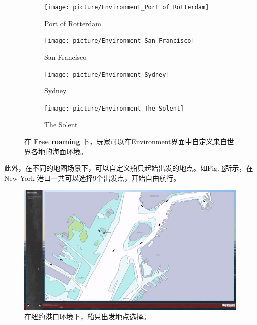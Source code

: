 \documentclass[letterpaper,10pt]{article}
\begin{document}
\begin{figure}[htbp]
					\begin{subfigure}{0.24\textwidth}
						\texttt{[image: picture/Environment\_Port of Rotterdam]}
						\captionsetup{font=scriptsize}
						\caption{Port of Rotterdam}
						\label{fig: Environment_Port of Rotterdam}
					\end{subfigure}
					\begin{subfigure}{0.24\textwidth}
						\texttt{[image: picture/Environment\_San Francisco]}
						\captionsetup{font=scriptsize}
						\caption{San Francisco}
						\label{fig: Environment_San Francisco}
					\end{subfigure}
					\begin{subfigure}{0.24\textwidth}
						\texttt{[image: picture/Environment\_Sydney]}
						\captionsetup{font=scriptsize}
						\caption{Sydney}
						\label{fig: Environment_Sydney}	
					\end{subfigure}
					\begin{subfigure}{0.24\textwidth}
						\texttt{[image: picture/Environment\_The Solent]}
						\captionsetup{font=scriptsize}
						\caption{The Solent}
						\label{fig: Environment_The Solent}	
					\end{subfigure}
					
					\captionsetup{font=scriptsize}
					\caption{
						\label{fig: Environment selection}
						在 \textbf{Free roaming} 下，玩家可以在Environment界面中自定义来自世界各地的海面环境。
					}
				\end{figure}
				
				此外，在不同的地图场景下，可以自定义船只起始出发的地点。如Fig. \ref{fig: Starting point selection}所示，在 New York 港口一共可以选择9个出发点，开始自由航行。
				
				\begin{figure}[htbp]
					\centering 
					\includegraphics[width=0.7\columnwidth]{picture/Starting point selection}
					\caption{
						\label{fig: Starting point selection} 
						在纽约港口环境下，船只出发地点选择。
					}	
				\end{figure}
				
\end{document}
